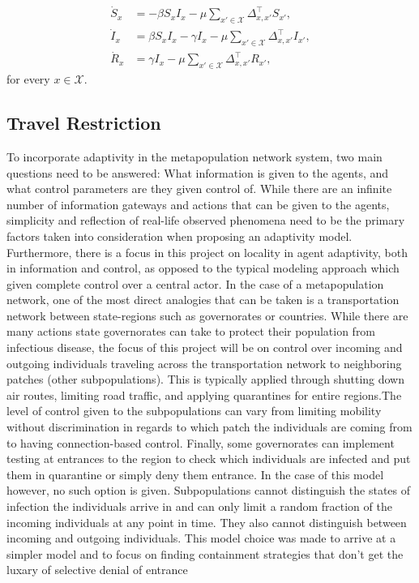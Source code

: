 \begin{equation}
\begin{aligned}
    \dot{S}_{x} &= -\beta S_{x} I_{x} - \mu \sum_{x' \in \mathcal{X}} \Delta_{x,x'}^{\top} S_{x'}, \\
    \dot{I}_{x} &= \beta S_{x} I_{x} - \gamma I_{x} - \mu \sum_{x' \in \mathcal{X}} \Delta_{x,x'}^{\top} I_{x'}, \\
    \dot{R}_{x} &= \gamma I_{x} - \mu \sum_{x' \in \mathcal{X}} \Delta_{x,x'}^{\top} R_{x'},
\end{aligned}
\end{equation}
for every $x \in \mathcal{X}$.



\subsection{Travel Restriction} %

To incorporate adaptivity in the metapopulation network system, two main questions need to be answered: What information is given to the agents, and what control parameters are they given control of. While there are an infinite number of information gateways and actions that can be given to the agents, simplicity and reflection of real-life observed phenomena need to be the primary factors taken into consideration when proposing an adaptivity model. Furthermore, there is a focus in this project on locality in agent adaptivity, both in information and control, as opposed to the typical modeling approach which given complete control over a central actor. In the case of a metapopulation network, one of the most direct analogies that can be taken is a transportation network between state-regions such as governorates or countries. While there are many actions state governorates can take to protect their population from infectious disease, the focus of this project will be on control over incoming and outgoing individuals traveling across the transportation network to neighboring patches (other subpopulations). This is typically applied through shutting down air routes, limiting road traffic, and applying quarantines for entire regions.The level of control given to the subpopulations can vary from limiting mobility without discrimination in regards to which patch the individuals are coming from to having connection-based control. Finally, some governorates can implement testing at entrances to the region to check which individuals are infected and put them in quarantine or simply deny them entrance. In the case of this model however, no such option is given. Subpopulations cannot distinguish the states of infection the individuals arrive in and can only limit a random fraction of the incoming individuals at any point in time. They also cannot distinguish between incoming and outgoing individuals. This model choice was made to arrive at a simpler model and to focus on finding containment strategies that don't get the luxary of selective denial of entrance\\

